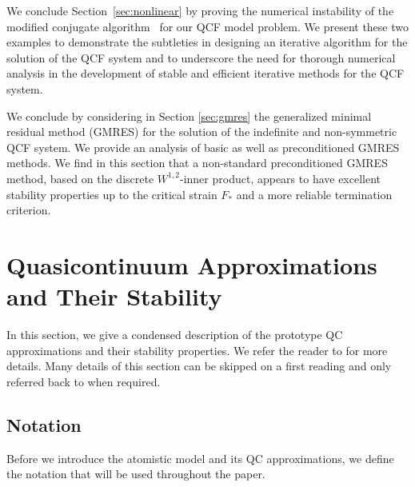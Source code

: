 \documentclass[12pt,reqno]{amsart}
\begin{document}
We conclude
Section~\ref{sec:nonlinear} by proving the numerical instability
of the modified conjugate algorithm~\cite{Miller:2008}
for our QCF model problem.
We present these two examples to demonstrate the subtleties in
designing an iterative algorithm for the solution of the QCF system
and to underscore the need for thorough
numerical analysis in the development of stable and efficient
iterative methods for the QCF system.

We conclude by considering in Section \ref{sec:gmres} the
generalized minimal residual method
(GMRES) for the solution of the indefinite and
non-symmetric QCF system.  We provide an analysis of basic as
well as preconditioned GMRES methods. We find in this section that
a non-standard preconditioned GMRES method, based on the discrete
$W^{1,2}$-inner product, appears to have excellent
stability properties up to the critical strain $F_*$
and a more reliable termination criterion.

\section{Quasicontinuum Approximations and Their Stability}
\label{sec:model}
In this section, we give a condensed description of the prototype QC
approximations and their stability properties.  We refer the reader to
\cite{sharpstabilityqcf,doblusort:qce.stab} for more details. Many
details of this section can be skipped on a first reading and only
referred back to when required.

\subsection{Notation}
\label{sec:notation}
Before we introduce the atomistic model and its QC approximations, we
define the notation that will be used throughout the paper.
\end{document}
